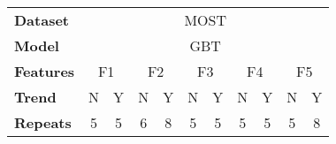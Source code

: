 \setcellgapes{1ex}\makegapedcells\centering\begin{tabular}{l|cccccccccc}
\toprule
\textbf{Dataset} & \multicolumn{10}{c}{MOST} \\
\textbf{Model} & \multicolumn{10}{c}{GBT} \\
\textbf{Features} & \multicolumn{2}{c}{F1} & \multicolumn{2}{c}{F2} & \multicolumn{2}{c}{F3} & \multicolumn{2}{c}{F4} & \multicolumn{2}{c}{F5} \\
\textbf{Trend} &    N &  Y &  N &  Y &  N &  Y &  N &  Y &  N &  Y \\
\midrule
\textbf{Repeats} &  5 &  5 &  6 &  8 &  5 &  5 &  5 &  5 &  5 &  8 \\
\bottomrule
\end{tabular}
